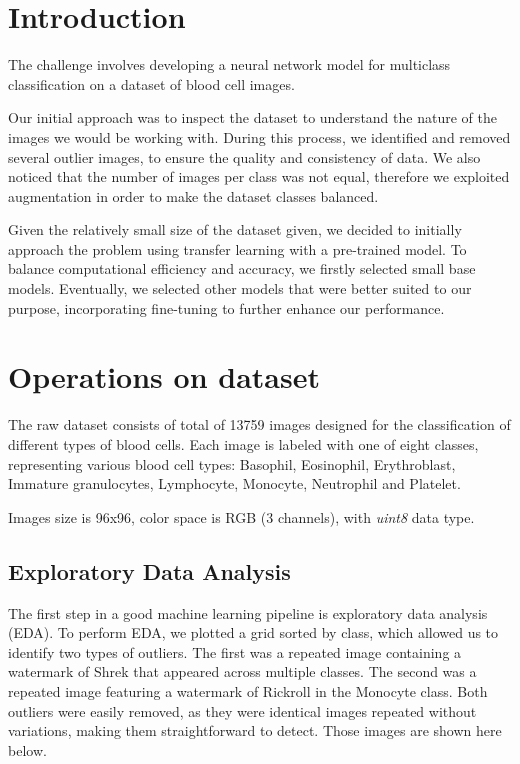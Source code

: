\documentclass[11pt]{article}
\begin{document}
\section{Introduction}

The challenge involves developing a neural network model for multiclass classification on a dataset of blood cell images.

Our initial approach was to inspect the dataset to understand the nature of the images we would be working with. 
During this process, we identified and removed several outlier images, to ensure the quality and consistency of data. 
We also noticed that the number of images per class was not equal, therefore we exploited augmentation in order to make the dataset classes balanced.

Given the relatively small size of the dataset given, we decided to initially approach the problem using transfer learning with a pre-trained model.
To balance computational efficiency and accuracy, we firstly selected small base models.
Eventually, we selected other models that were better suited to our purpose, incorporating fine-tuning to further enhance our performance.

\section{Operations on dataset}
The raw dataset consists of total of 13759 images designed for the classification of different types of blood cells. Each image is labeled with one of eight classes, representing various blood cell types: Basophil, Eosinophil, Erythroblast, Immature granulocytes, Lymphocyte, Monocyte, Neutrophil and Platelet.

Images size is 96x96, color space is RGB (3 channels), with \textit{uint8} data type.

\subsection{Exploratory Data Analysis}

The first step in a good machine learning pipeline is exploratory data analysis (EDA).
To perform EDA, we plotted a grid sorted by class, which allowed us to identify two types of outliers.
The first was a repeated image containing a watermark of Shrek that appeared across multiple classes. 
The second was a repeated image featuring a watermark of Rickroll in the Monocyte class.
Both outliers were easily removed, as they were identical images repeated without variations, making them straightforward to detect.
Those images are shown here below.
\end{document}
